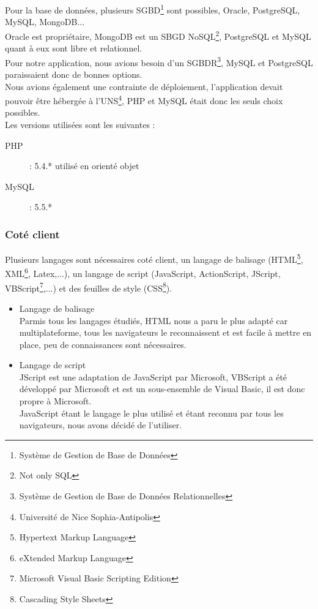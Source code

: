 \documentclass{sigplanconf}
\begin{document}
Pour la base de données, plusieurs SGBD\footnote{Système de Gestion de Base de Données} sont possibles, Oracle, PostgreSQL, MySQL, MongoDB...\\
Oracle est propriétaire, MongoDB est un SBGD NoSQL\footnote{Not only SQL}, PostgreSQL et MySQL quant à eux sont libre et relationnel.\\
Pour notre application, nous avions besoin d'un SGBDR\footnote{Système de Gestion de Base de Données Relationnelles}, MySQL et PostgreSQL paraissaient donc de bonnes options.\\

Nous avions également une contrainte de déploiement, l'application devait pouvoir être hébergée à l'UNS\footnote{Université de Nice Sophia-Antipolis}, PHP\cite{urlPHP} et MySQL\cite{urlMySQL} était donc les seuls choix possibles.\\
Les versions utilisées sont les suivantes : 
\begin{description}
\item [PHP] : 5.4.* utilisé en orienté objet
\item [MySQL] : 5.5.*
\end{description}

\subsubsection{Coté client}
Plusieurs langages sont nécessaires coté client, un langage de balisage (HTML\footnote{Hypertext Markup Language}, XML\footnote{eXtended Markup Language}, Latex,...), un langage de script (JavaScript, ActionScript, JScript, VBScript\footnote{Microsoft Visual Basic Scripting Edition},...) et des feuilles de style (CSS\footnote{Cascading Style Sheets}).
\begin{itemize}
\item Langage de balisage\\
Parmis tous les langages étudiés, HTML nous a paru le plus adapté car multiplateforme, tous les navigateurs le reconnaissent et est facile à mettre en place, peu de connaissances sont nécessaires.
\item Langage de script\\
JScript est une adaptation de JavaScript par Microsoft, VBScript a été développé par Microsoft et est un sous-ensemble de Visual Basic, il est donc propre à Microsoft.\\
JavaScript étant le langage le plus utilisé et étant reconnu par tous les navigateurs, nous avons décidé de l'utiliser.
\end{itemize}
\end{document}
